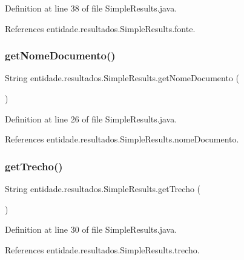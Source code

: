 Definition at line 38 of file Simple\+Results.\+java.



References entidade.\+resultados.\+Simple\+Results.\+fonte.

\hypertarget{classentidade_1_1resultados_1_1SimpleResults_a42841134beb2bdeada3038d4550bf177}{}\label{classentidade_1_1resultados_1_1SimpleResults_a42841134beb2bdeada3038d4550bf177} 
\subsubsection{\texorpdfstring{get\+Nome\+Documento()}{getNomeDocumento()}}
{\footnotesize\ttfamily String entidade.\+resultados.\+Simple\+Results.\+get\+Nome\+Documento (\begin{DoxyParamCaption}{ }\end{DoxyParamCaption})}



Definition at line 26 of file Simple\+Results.\+java.



References entidade.\+resultados.\+Simple\+Results.\+nome\+Documento.

\hypertarget{classentidade_1_1resultados_1_1SimpleResults_ae3d772893f928871dd13263ba4453e11}{}\label{classentidade_1_1resultados_1_1SimpleResults_ae3d772893f928871dd13263ba4453e11} 
\subsubsection{\texorpdfstring{get\+Trecho()}{getTrecho()}}
{\footnotesize\ttfamily String entidade.\+resultados.\+Simple\+Results.\+get\+Trecho (\begin{DoxyParamCaption}{ }\end{DoxyParamCaption})}



Definition at line 30 of file Simple\+Results.\+java.



References entidade.\+resultados.\+Simple\+Results.\+trecho.

